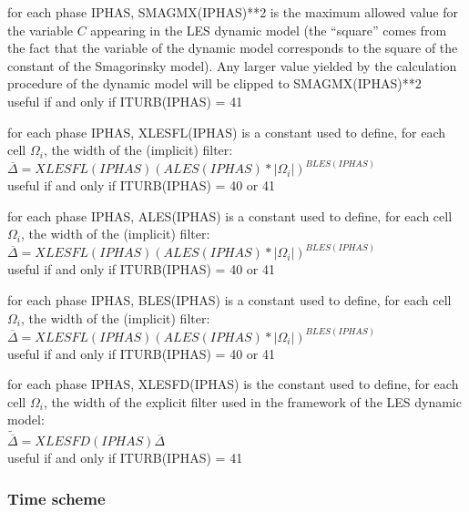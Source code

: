 {for each phase IPHAS, SMAGMX(IPHAS)**2 is
the maximum allowed value for the variable $C$ appearing in the LES dynamic
model (the ``square'' comes from the fact that the
variable of the dynamic model corresponds to the square of the
constant of the Smagorinsky model). Any larger value yielded by the calculation
procedure of the dynamic model will be clipped to SMAGMX(IPHAS)**2\\
useful if and only if ITURB(IPHAS) = 41}

{for each phase IPHAS, XLESFL(IPHAS) is a constant used to define, for
each cell $\Omega_i$, the width of the (implicit) filter:\\
$\overline{\Delta}=XLESFL(IPHAS)(ALES(IPHAS)*|\Omega_i|)^{BLES(IPHAS)}$\\
useful if and only if ITURB(IPHAS) = 40 or 41}

{for each phase IPHAS, ALES(IPHAS) is a constant used to define, for
each cell $\Omega_i$, the width of the (implicit) filter:\\
$\overline{\Delta}=XLESFL(IPHAS)(ALES(IPHAS)*|\Omega_i|)^{BLES(IPHAS)}$\\
useful if and only if ITURB(IPHAS) = 40 or 41}

{for each phase IPHAS, BLES(IPHAS) is a constant used to define, for
each cell $\Omega_i$, the width of the (implicit) filter:\\
$\overline{\Delta}=XLESFL(IPHAS)(ALES(IPHAS)*|\Omega_i|)^{BLES(IPHAS)}$\\
useful if and only if ITURB(IPHAS) = 40 or 41}

{for each phase IPHAS, XLESFD(IPHAS) is the constant used to define, for
each cell $\Omega_i$, the width of the explicit filter used in the framework of
the LES dynamic model:\\
$\widetilde{\overline{\Delta}}=XLESFD(IPHAS)\overline{\Delta}$\\
useful if and only if ITURB(IPHAS) = 41}



\subsubsection{Time scheme}

